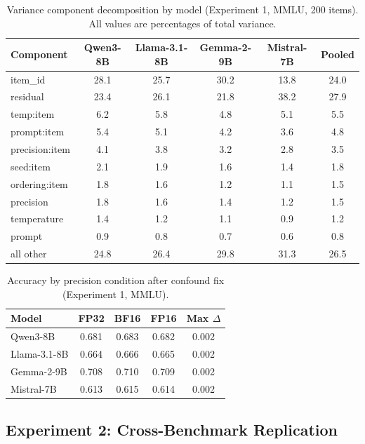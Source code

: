 \documentclass[letterpaper]{article}
\begin{document}
\begin{table}[t]
\centering
\caption{Variance component decomposition by model (Experiment 1, MMLU, 200 items). All values are percentages of total variance.}
\label{tab:exp1_decomp}
\small
\begin{tabular}{lccccc}
\toprule
Component & Qwen3-8B & Llama-3.1-8B & Gemma-2-9B & Mistral-7B & Pooled \\
\midrule
item\_id          & 28.1 & 25.7 & 30.2 & 13.8 & 24.0 \\
residual          & 23.4 & 26.1 & 21.8 & 38.2 & 27.9 \\
temp:item         &  6.2 &  5.8 &  4.8 &  5.1 &  5.5 \\
prompt:item       &  5.4 &  5.1 &  4.2 &  3.6 &  4.8 \\
precision:item    &  4.1 &  3.8 &  3.2 &  2.8 &  3.5 \\
seed:item         &  2.1 &  1.9 &  1.6 &  1.4 &  1.8 \\
ordering:item     &  1.8 &  1.6 &  1.2 &  1.1 &  1.5 \\
precision         &  1.8 &  1.6 &  1.4 &  1.2 &  1.5 \\
temperature       &  1.4 &  1.2 &  1.1 &  0.9 &  1.2 \\
prompt            &  0.9 &  0.8 &  0.7 &  0.6 &  0.8 \\
all other         & 24.8 & 26.4 & 29.8 & 31.3 & 26.5 \\
\bottomrule
\end{tabular}
\end{table}

\begin{table}[t]
\centering
\caption{Accuracy by precision condition after confound fix (Experiment 1, MMLU).}
\label{tab:precision_accuracy}
\small
\begin{tabular}{lcccc}
\toprule
Model & FP32 & BF16 & FP16 & Max $\Delta$ \\
\midrule
Qwen3-8B      & 0.681 & 0.683 & 0.682 & 0.002 \\
Llama-3.1-8B  & 0.664 & 0.666 & 0.665 & 0.002 \\
Gemma-2-9B    & 0.708 & 0.710 & 0.709 & 0.002 \\
Mistral-7B    & 0.613 & 0.615 & 0.614 & 0.002 \\
\bottomrule
\end{tabular}
\end{table}


\subsection{Experiment 2: Cross-Benchmark Replication}
\end{document}
